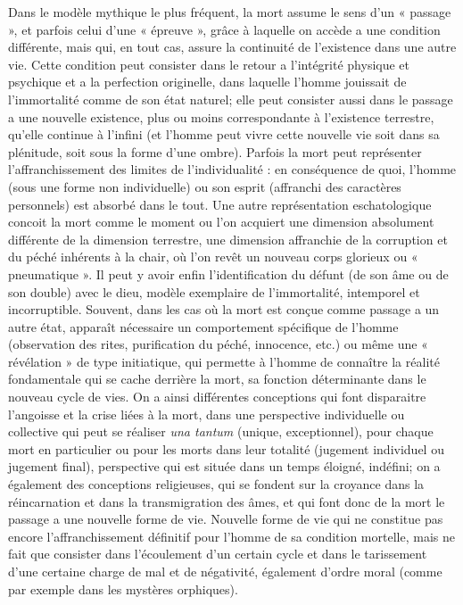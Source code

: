 Dans le modèle mythique le plus fréquent, la mort assume le sens d'un « passage », et parfois celui d'une « épreuve », grâce à laquelle on accède a une condition différente, mais qui, en tout cas, assure la continuité de l'existence dans une autre vie. Cette condition peut consister dans le retour a l'intégrité physique et psychique et a la perfection originelle, dans laquelle l'homme jouissait de l'immortalité comme de son état naturel; elle peut consister aussi dans le passage a une nouvelle existence, plus ou moins correspondante à l'existence terrestre, qu'elle continue à l'infini (et l'homme peut vivre cette nouvelle vie soit dans sa plénitude, soit sous la forme d'une ombre). Parfois la mort peut représenter l'affranchissement des limites de l'individualité : en conséquence de quoi, l'homme (sous une forme non individuelle) ou son esprit (affranchi des caractères personnels) est absorbé dans le tout. Une autre représentation eschatologique concoit la mort comme le moment ou l'on acquiert une dimension absolument différente de la dimension terrestre, une dimension affranchie de la corruption et du péché inhérents à la chair, où l'on revêt un nouveau corps glorieux ou
« pneumatique ». Il peut y avoir enfin l'identification du défunt (de son âme ou de son double) avec le dieu, modèle exemplaire de l'immortalité, intemporel et incorruptible. Souvent, dans les cas où la mort est conçue comme passage a un autre état, apparaît nécessaire un comportement spécifique de l'homme (observation des rites, purification du péché, innocence, etc.) ou même une « révélation » de type initiatique, qui permette à l'homme de connaître la réalité fondamentale qui se cache derrière la mort, sa fonction déterminante dans le nouveau cycle de vies. On a ainsi différentes conceptions qui font disparaitre l'angoisse et la crise liées à la mort, dans une perspective individuelle ou collective qui peut se réaliser {\it una tantum} (unique, exceptionnel), pour chaque mort en particulier ou pour les morts dans leur totalité (jugement individuel ou jugement final), perspective qui est située dans un temps éloigné, indéfini; on a également des conceptions religieuses, qui se fondent sur la croyance dans la réincarnation et dans la transmigration des âmes, et qui font donc de la mort le passage a une nouvelle forme de vie. Nouvelle forme de vie qui ne constitue pas encore l'affranchissement définitif pour l'homme de sa condition mortelle, mais ne fait que consister dans l'écoulement d'un certain cycle et dans le tarissement d'une certaine charge de mal et de négativité, également d'ordre moral (comme par exemple dans les mystères orphiques).

